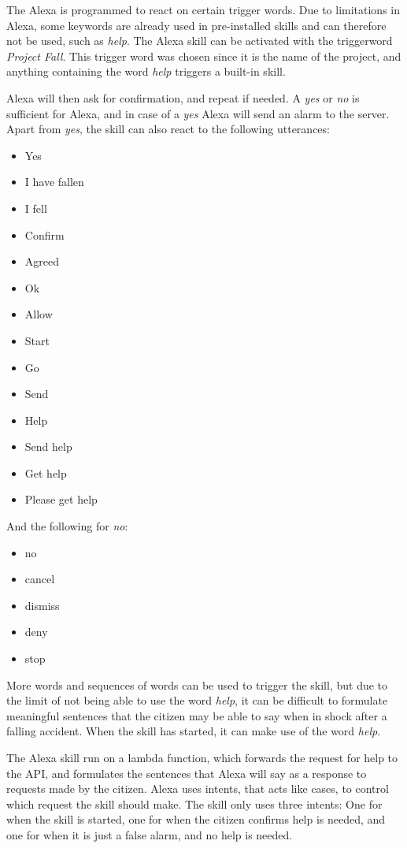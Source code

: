 The Alexa is programmed to react on certain trigger words. Due to limitations in Alexa, some keywords are already used in pre-installed skills and can therefore not be used, such as \textit{help}. The Alexa skill can be activated with the triggerword \textit{Project Fall}. This trigger word was chosen since it is the name of the project, and anything containing the word \textit{help} triggers a built-in skill.

Alexa will then ask for confirmation, and repeat if needed. A \textit{yes} or \textit{no} is sufficient for Alexa, and in case of a \textit{yes} Alexa will send an alarm to the server. Apart from \textit{yes}, the skill can also react to the following utterances:

\begin{itemize}
    \item Yes
    \item I have fallen
    \item I fell
    \item Confirm
    \item Agreed
    \item Ok
    \item Allow
    \item Start
    \item Go
    \item Send
    \item Help
    \item Send help
    \item Get help
    \item Please get help
\end{itemize}

And the following for \textit{no}:

\begin{itemize}
    \item no
    \item cancel
    \item dismiss
    \item deny
    \item stop
\end{itemize}

More words and sequences of words can be used to trigger the skill, but due to the limit of not being able to use the word \textit{help}, it can be difficult to formulate meaningful sentences that the citizen may be able to say when in shock after a falling accident. When the skill has started, it can make use of the word \textit{help}.

The Alexa skill run on a lambda function, which forwards the request for help to the API, and formulates the sentences that Alexa will say as a response to requests made by the citizen. Alexa uses intents, that acts like cases, to control which request the skill should make. The skill only uses three intents: One for when the skill is started, one for when the citizen confirms help is needed, and one for when it is just a false alarm, and no help is needed.

